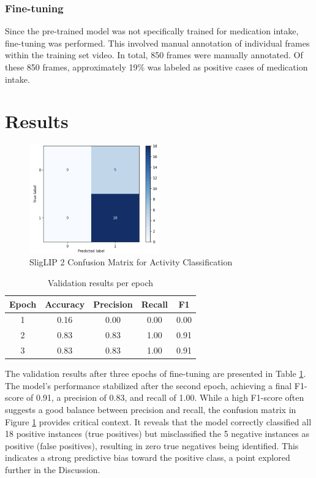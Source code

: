 \documentclass[a4paper,12pt]{article}
\begin{document}
\subsubsection{Fine-tuning}
Since the pre-trained model was not specifically trained for medication intake, fine-tuning was performed. This 
involved manual annotation of individual frames within the training set video. In total, 850 frames  were manually
annotated. Of these 850  frames, approximately 19\% was labeled as positive cases of medication intake.


\section{Results}
\begin{figure}[H]
    \centering
    \includegraphics[width=0.5\textwidth]{./images/test confusion matrix.png} %
    \caption{SligLIP 2 Confusion Matrix for Activity Classification}
    \label{fig:test-cm}
\end{figure}


\begin{table}[H]
    \centering
    \begin{tabular}{|c||c|c|c|c|}
        \hline
        Epoch & Accuracy & Precision & Recall & F1 \\
        \hline
        1 & 0.16 & 0.00 & 0.00 & 0.00 \\
        2 & 0.83 & 0.83 & 1.00 & 0.91 \\
        3 & 0.83 & 0.83 & 1.00 & 0.91 \\
        \hline
    \end{tabular}
    \caption{Validation results per epoch}
    \label{tab:val-results}
\end{table}


The validation results after three epochs of fine-tuning are presented in Table \ref{tab:val-results}. The model's performance stabilized after the second epoch, achieving a final F1-score of 0.91, a precision of 0.83, and recall of 1.00. While a high F1-score often suggests a good balance between precision and recall, the confusion matrix in Figure \ref{fig:test-cm} provides critical context. It reveals that the model correctly classified all 18 positive instances (true positives) but misclassified the 5 negative instances as positive (false positives), resulting in zero true negatives being identified. This indicates a strong predictive bias toward the positive class, a point explored further in the Discussion.
\end{document}
